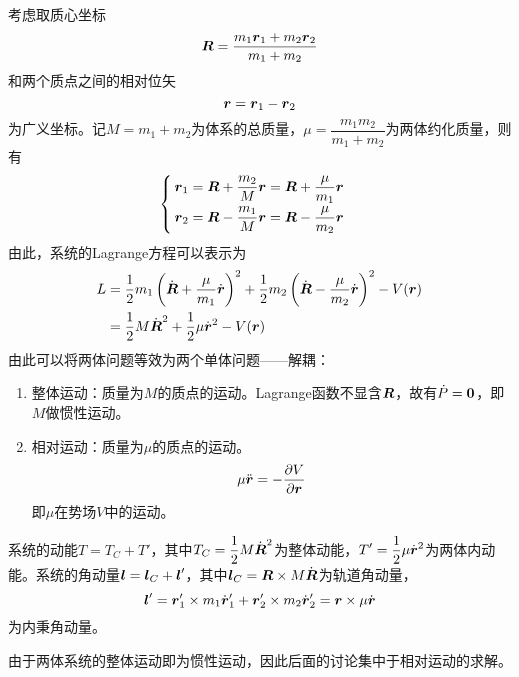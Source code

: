 考虑取质心坐标
\begin{equation}
	\boldsymbol{R} = \frac{m_1\boldsymbol{r}_1+m_2\boldsymbol{r}_2}{m_1+m_2}
\end{equation}
和两个质点之间的相对位矢
\begin{equation}
	\boldsymbol{r} = \boldsymbol{r}_1 - \boldsymbol{r}_2
\end{equation}
为广义坐标。记$M = m_1+m_2$为体系的{\heiti 总质量}，$\mu = \dfrac{m_1m_2}{m_1+m_2}$为两体{\heiti 约化质量}，则有
\begin{equation}
	\begin{cases}
		\displaystyle \boldsymbol{r}_1 = \boldsymbol{R} + \frac{m_2}{M}\boldsymbol{r} = \boldsymbol{R} + \frac{\mu}{m_1} \boldsymbol{r} \\[1.5ex]
		\displaystyle \boldsymbol{r}_2 = \boldsymbol{R} - \frac{m_1}{M}\boldsymbol{r} = \boldsymbol{R} - \frac{\mu}{m_2} \boldsymbol{r}
	\end{cases}
	\label{两体问题广义坐标变换}
\end{equation}
由此，系统的Lagrange方程可以表示为
\begin{align}
	L & = \frac12 m_1 \left(\dot{\boldsymbol{R}}+\frac{\mu}{m_1}\dot{\boldsymbol{r}}\right)^2 + \frac12 m_2 \left(\dot{\boldsymbol{R}}-\frac{\mu}{m_2}\dot{\boldsymbol{r}}\right)^2 - V(\boldsymbol{r}) \nonumber \\
	& = \frac12 M\dot{\boldsymbol{R}}^2 + \frac12 \mu \dot{\boldsymbol{r}}^2 - V(\boldsymbol{r})
\end{align}
由此可以将两体问题等效为两个单体问题——解耦：
\begin{enumerate}
	\item 整体运动：质量为$M$的质点的运动。Lagrange函数不显含$\boldsymbol{R}$，故有$\dot{P} = \boldsymbol{0}$，即$M$做惯性运动。
	\item 相对运动：质量为$\mu$的质点的运动。
	\begin{equation*}
		\mu \ddot{\boldsymbol{r}} = -\frac{\partial V}{\partial \boldsymbol{r}}
	\end{equation*}
	即$\mu$在势场$V$中的运动。
\end{enumerate}
系统的动能$T=T_C+T'$，其中$\displaystyle T_C = \frac12 M\dot{\boldsymbol{R}}^2$为整体动能，$\displaystyle T' = \frac12 \mu\dot{\boldsymbol{r}}^2$为两体内动能。系统的角动量$\boldsymbol{l} = \boldsymbol{l}_C+\boldsymbol{l}'$，其中$\boldsymbol{l}_C = \boldsymbol{R} \times M\dot{\boldsymbol{R}}$为轨道角动量，
\begin{equation*}
	\boldsymbol{l}' = \boldsymbol{r}'_1 \times m_1 \dot{\boldsymbol{r}}'_1 + \boldsymbol{r}'_2 \times m_2 \dot{\boldsymbol{r}}'_2 = \boldsymbol{r} \times \mu \dot{\boldsymbol{r}}
\end{equation*}
为内秉角动量。

由于两体系统的整体运动即为惯性运动，因此后面的讨论集中于相对运动的求解。

